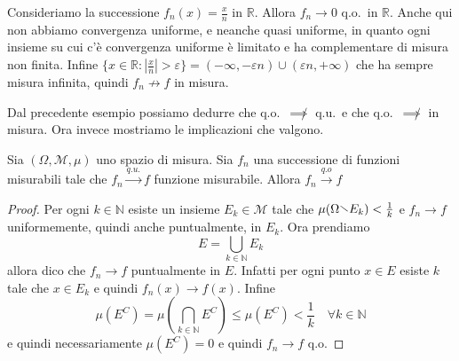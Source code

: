 \begin{example}
    Consideriamo la successione \(f_{n}{(x)} = \frac{x}{n}\) in \(\mathbb{R}\).
    Allora \(f_{n} \to 0\) q.o.~in \(\mathbb{R}\). Anche qui non abbiamo
    convergenza uniforme, e neanche quasi uniforme, in quanto ogni insieme su
    cui c'è convergenza uniforme è limitato e ha complementare di misura non
    finita.
    Infine \(\{x \in \mathbb{R} : | \frac{x}{n}| > \varepsilon\} = {(-\infty,
    - \varepsilon n) \cup {(\varepsilon n , +\infty)}} \) che ha sempre misura
    infinita, quindi \(f_{n} \not\to f \) in misura.
\end{example}
Dal precedente esempio possiamo dedurre che q.o.~\(\not\implies\) q.u.~e che
q.o.~\(\not\implies\) in misura. Ora invece mostriamo le implicazioni che
valgono. 
\begin{theorem}\label{thm:qu_qo}
    Sia \((\Omega, \mathcal{M}, \mu)\) uno spazio di misura.
    Sia \(f_{n}\) una successione di funzioni misurabili tale che \(f_{n}
    \overset{q.u.}{\to } f\) funzione misurabile. Allora \(f_{n}
    \overset{q.o}{\to } f\) 
\end{theorem}
\begin{proof}
    Per ogni \(k \in \mathbb{N}\) esiste un insieme \(E_k \in
    \mathcal{M}\) tale che \(\mu{(\Omega \sminus E_k)} <\frac{1}{k}\) e \(f_{n}
    \to f\) uniformemente, quindi anche puntualmente, in \(E_k\). Ora prendiamo
    \[
        E = \bigcup_{k \in \mathbb{N}} E_k
    \]
    allora dico che \(f_{n} \to f\) puntualmente in \(E\). Infatti per ogni
    punto \(x \in E\) esiste \(k\) tale che \(x \in E_k\) e quindi \(f_{n}{(x)} \to
    f{(x)}\). Infine
    \[
        \mu{(E^{C})} = \mu{\left( \bigcap_{k \in \mathbb{N}} E^{C}  \right)} \le
        \mu{\left( E^{C} \right)} < \frac{1}{k} \quad \forall k \in \mathbb{N}
    \]
    e quindi necessariamente \(\mu{(E^{C})} = 0\) e quindi \(f_{n} \to f\) q.o.
\end{proof}

